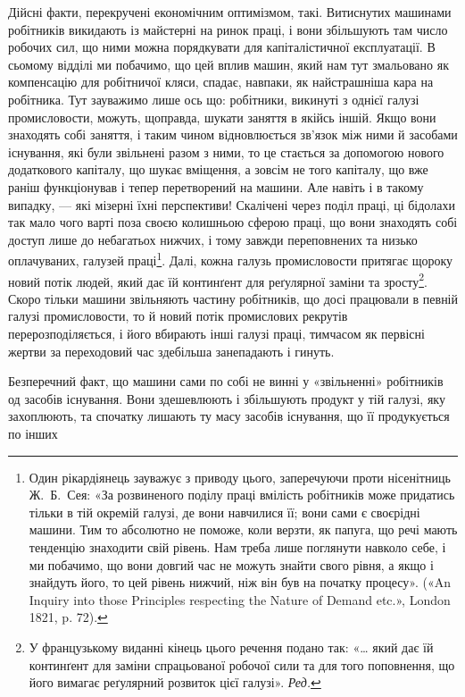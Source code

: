 Дійсні факти, перекручені економічним оптимізмом, такі.
Витиснутих машинами робітників викидають із майстерні на
ринок праці, і вони збільшують там число робочих сил, що ними
можна порядкувати для капіталістичної експлуатації. В сьомому
відділі ми побачимо, що цей вплив машин, який нам тут змальовано
як компенсацію для робітничої кляси, спадає, навпаки, як
найстрашніша кара на робітника. Тут зауважимо лише ось
що: робітники, викинуті з однієї галузі промисловости, можуть,
щоправда, шукати заняття в якійсь іншій. Якщо вони знаходять
собі заняття, і таким чином відновлюється зв’язок між ними й
засобами існування, які були звільнені разом з ними, то це
стається за допомогою нового додаткового капіталу, що шукає
вміщення, а зовсім не того капіталу, що вже раніш функціонував
і тепер перетворений на машини. Але навіть і в такому випадку,
— які мізерні їхні перспективи! Скалічені через поділ праці,
ці бідолахи так мало чого варті поза своєю колишньою сферою
праці, що вони знаходять собі доступ лише до небагатьох нижчих,
і тому завжди переповнених та низько оплачуваних, галузей
праці\footnote{
Один рікардіянець зауважує з приводу цього, заперечуючи проти
нісенітниць Ж.~Б.~Сея: «За розвиненого поділу праці вмілість робітників
може придатись тільки в тій окремій галузі, де вони навчилися її; вони
сами є своєрідні машини. Тим то абсолютно не поможе, коли верзти, як
папуга, що речі мають тенденцію знаходити свій рівень. Нам треба лише
поглянути навколо себе, і ми побачимо, що вони довгий час не можуть
знайти свого рівня, а якщо і знайдуть його, то цей рівень нижчий, ніж
він був на початку процесу». («An Inquiry into those Principles respecting
the Nature of Demand etc.», London 1821, p. 72).
}. Далі, кожна галузь промисловости притягає щороку
новий потік людей, який дає їй континґент для реґулярної заміни
та зросту\footnote*{
У французькому виданні кінець цього речення подано так: «\dots{} який
дає їй континґент для заміни спрацьованої робочої сили та для того поповнення,
що його вимагає реґулярний розвиток цієї галузі». \emph{Ред.}
}. Скоро тільки машини звільняють частину робітників,
що досі працювали в певній галузі промисловости, то й новий
потік промислових рекрутів перерозподіляється, і його вбирають
інші галузі праці, тимчасом як первісні жертви за переходовий
час здебільша занепадають і гинуть.

Безперечний факт, що машини сами по собі не винні у «звільненні»
робітників од засобів існування. Вони здешевлюють і
збільшують продукт у тій галузі, яку захоплюють, та спочатку
лишають ту масу засобів існування, що її продукується по інших
\parbreak{}  %
